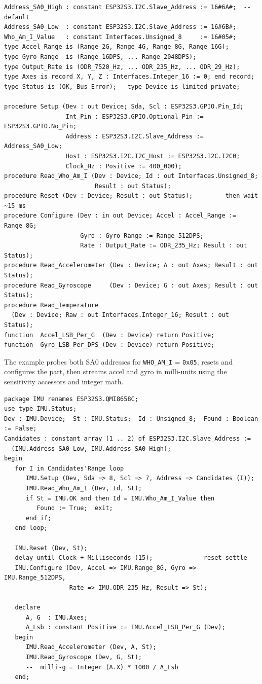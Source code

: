 \begin{lstlisting}
Address_SA0_High : constant ESP32S3.I2C.Slave_Address := 16#6A#;  --  default
Address_SA0_Low  : constant ESP32S3.I2C.Slave_Address := 16#6B#;
Who_Am_I_Value   : constant Interfaces.Unsigned_8     := 16#05#;
type Accel_Range is (Range_2G, Range_4G, Range_8G, Range_16G);
type Gyro_Range  is (Range_16DPS, ... Range_2048DPS);
type Output_Rate is (ODR_7520_Hz, ... ODR_235_Hz, ... ODR_29_Hz);
type Axes is record X, Y, Z : Interfaces.Integer_16 := 0; end record;
type Status is (OK, Bus_Error);   type Device is limited private;

procedure Setup (Dev : out Device; Sda, Scl : ESP32S3.GPIO.Pin_Id;
                 Int_Pin : ESP32S3.GPIO.Optional_Pin := ESP32S3.GPIO.No_Pin;
                 Address : ESP32S3.I2C.Slave_Address := Address_SA0_Low;
                 Host : ESP32S3.I2C.I2C_Host := ESP32S3.I2C.I2C0;
                 Clock_Hz : Positive := 400_000);
procedure Read_Who_Am_I (Dev : Device; Id : out Interfaces.Unsigned_8;
                         Result : out Status);
procedure Reset (Dev : Device; Result : out Status);     --  then wait ~15 ms
procedure Configure (Dev : in out Device; Accel : Accel_Range := Range_8G;
                     Gyro : Gyro_Range := Range_512DPS;
                     Rate : Output_Rate := ODR_235_Hz; Result : out Status);
procedure Read_Accelerometer (Dev : Device; A : out Axes; Result : out Status);
procedure Read_Gyroscope     (Dev : Device; G : out Axes; Result : out Status);
procedure Read_Temperature
  (Dev : Device; Raw : out Interfaces.Integer_16; Result : out Status);
function  Accel_LSB_Per_G  (Dev : Device) return Positive;
function  Gyro_LSB_Per_DPS (Dev : Device) return Positive;
\end{lstlisting}

The example probes both SA0 addresses for \texttt{WHO\_AM\_I} = \texttt{0x05},
resets and configures the part, then streams accel and gyro in milli-units using
the sensitivity accessors and integer math.

\begin{lstlisting}
package IMU renames ESP32S3.QMI8658C;
use type IMU.Status;
Dev : IMU.Device;  St : IMU.Status;  Id : Unsigned_8;  Found : Boolean := False;
Candidates : constant array (1 .. 2) of ESP32S3.I2C.Slave_Address :=
  (IMU.Address_SA0_Low, IMU.Address_SA0_High);
begin
   for I in Candidates'Range loop
      IMU.Setup (Dev, Sda => 8, Scl => 7, Address => Candidates (I));
      IMU.Read_Who_Am_I (Dev, Id, St);
      if St = IMU.OK and then Id = IMU.Who_Am_I_Value then
         Found := True;  exit;
      end if;
   end loop;

   IMU.Reset (Dev, St);
   delay until Clock + Milliseconds (15);          --  reset settle
   IMU.Configure (Dev, Accel => IMU.Range_8G, Gyro => IMU.Range_512DPS,
                  Rate => IMU.ODR_235_Hz, Result => St);

   declare
      A, G  : IMU.Axes;
      A_Lsb : constant Positive := IMU.Accel_LSB_Per_G (Dev);
   begin
      IMU.Read_Accelerometer (Dev, A, St);
      IMU.Read_Gyroscope (Dev, G, St);
      --  milli-g = Integer (A.X) * 1000 / A_Lsb
   end;
\end{lstlisting}

